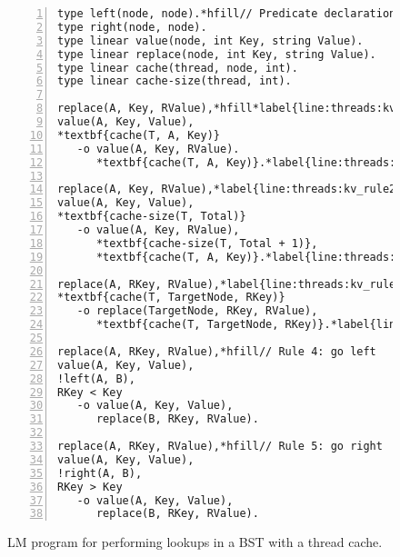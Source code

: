 \begin{figure}[ht]
\begin{Verbatim}[numbers=left,fontsize=\codesize,commandchars=*\{\}]
type left(node, node).*hfill// Predicate declaration
type right(node, node).
type linear value(node, int Key, string Value).
type linear replace(node, int Key, string Value).
type linear cache(thread, node, int).
type linear cache-size(thread, int).

replace(A, Key, RValue),*hfill*label{line:threads:kv_rule1_start}// Rule 1: key exists and is also in the cache
value(A, Key, Value),
*textbf{cache(T, A, Key)}
   -o value(A, Key, RValue).
      *textbf{cache(T, A, Key)}.*label{line:threads:kv_rule1_end}

replace(A, Key, RValue),*label{line:threads:kv_rule2_start}*hfill// Rule 2: key exists and is not in the cache
value(A, Key, Value),
*textbf{cache-size(T, Total)}
   -o value(A, Key, RValue),
      *textbf{cache-size(T, Total + 1)},
      *textbf{cache(T, A, Key)}.*label{line:threads:kv_rule2_end}

replace(A, RKey, RValue),*label{line:threads:kv_rule3_start}*hfill// Rule 3: cached by the thread
*textbf{cache(T, TargetNode, RKey)}
   -o replace(TargetNode, RKey, RValue),
      *textbf{cache(T, TargetNode, RKey)}.*label{line:threads:kv_rule3_end}

replace(A, RKey, RValue),*hfill// Rule 4: go left
value(A, Key, Value),
!left(A, B),
RKey < Key
   -o value(A, Key, Value),
      replace(B, RKey, RValue).

replace(A, RKey, RValue),*hfill// Rule 5: go right
value(A, Key, Value),
!right(A, B),
RKey > Key
   -o value(A, Key, Value),
      replace(B, RKey, RValue).
\end{Verbatim}
\caption{LM program for performing lookups in a BST with a thread cache.}
\label{code:threads:btree_lookup_cache}
\end{figure}

\clearpage
